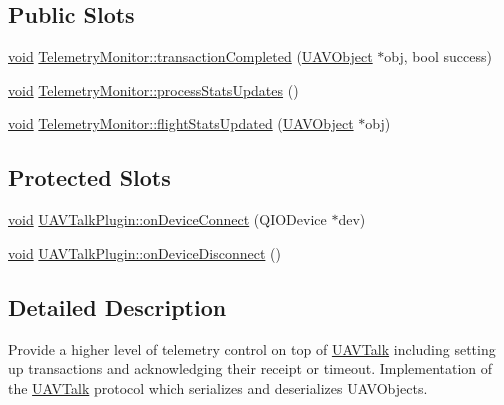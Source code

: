 \subsection*{\-Public \-Slots}
\begin{DoxyCompactItemize}
\item 
\hyperlink{group___u_a_v_objects_plugin_ga444cf2ff3f0ecbe028adce838d373f5c}{void} \hyperlink{group___u_a_v_talk_plugin_ga2b5452341c351cd2d67c46469b855607}{\-Telemetry\-Monitor\-::transaction\-Completed} (\hyperlink{class_u_a_v_object}{\-U\-A\-V\-Object} $\ast$obj, bool success)
\item 
\hyperlink{group___u_a_v_objects_plugin_ga444cf2ff3f0ecbe028adce838d373f5c}{void} \hyperlink{group___u_a_v_talk_plugin_ga2e16b3d1a298f851879d22749d1e38e9}{\-Telemetry\-Monitor\-::process\-Stats\-Updates} ()
\item 
\hyperlink{group___u_a_v_objects_plugin_ga444cf2ff3f0ecbe028adce838d373f5c}{void} \hyperlink{group___u_a_v_talk_plugin_ga31c0b7ae632d68a5584d1f0696e35766}{\-Telemetry\-Monitor\-::flight\-Stats\-Updated} (\hyperlink{class_u_a_v_object}{\-U\-A\-V\-Object} $\ast$obj)
\end{DoxyCompactItemize}
\subsection*{\-Protected \-Slots}
\begin{DoxyCompactItemize}
\item 
\hyperlink{group___u_a_v_objects_plugin_ga444cf2ff3f0ecbe028adce838d373f5c}{void} \hyperlink{group___u_a_v_talk_plugin_ga496d6211736a7cfd5cee129eb2b8ad95}{\-U\-A\-V\-Talk\-Plugin\-::on\-Device\-Connect} (\-Q\-I\-O\-Device $\ast$dev)
\item 
\hyperlink{group___u_a_v_objects_plugin_ga444cf2ff3f0ecbe028adce838d373f5c}{void} \hyperlink{group___u_a_v_talk_plugin_ga1ac9b2c0c21d66d603c639183ebcd7db}{\-U\-A\-V\-Talk\-Plugin\-::on\-Device\-Disconnect} ()
\end{DoxyCompactItemize}


\subsection{\-Detailed \-Description}
\-Provide a higher level of telemetry control on top of \hyperlink{class_u_a_v_talk}{\-U\-A\-V\-Talk} including setting up transactions and acknowledging their receipt or timeout. \-Implementation of the \hyperlink{class_u_a_v_talk}{\-U\-A\-V\-Talk} protocol which serializes and deserializes \-U\-A\-V\-Objects.

